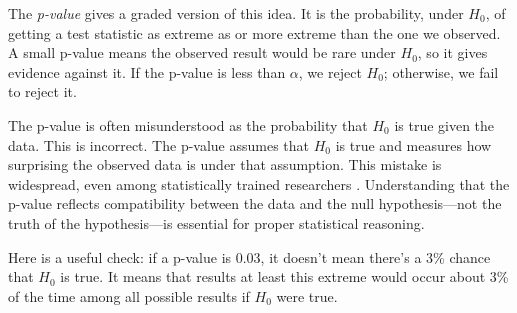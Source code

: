 The \emph{p-value} gives a graded version of this idea. It
is the probability, under $H_0$, of getting a test statistic as extreme
as or more extreme than the one we observed. A small p-value means the
observed result would be rare under $H_0$, so it gives evidence against
it. If the p-value is less than $\alpha$, we reject $H_0$; otherwise, we
fail to reject it.


The p-value is often misunderstood as the probability that $H_0$ is
true given the data. This is incorrect. The p-value assumes that
$H_0$ is true and measures how surprising the observed data is under
that assumption. This mistake is widespread, even among statistically
trained researchers
\citep{falk1995significance}. Understanding that the p-value reflects 
compatibility between the data and the null hypothesis---not the truth of 
the hypothesis---is essential for proper statistical reasoning.

Here is a useful check: if a p-value is 0.03, it doesn't mean there's
a 3\% chance that $H_0$ is true. It means that results at least this
extreme would occur about 3\% of the time among all possible results if
$H_0$ were true.


